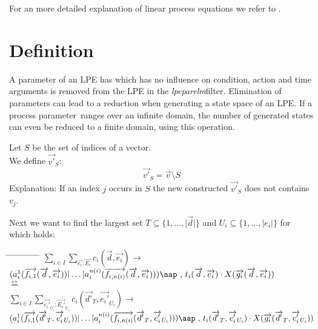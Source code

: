 \documentclass[a4paper,10pt]{article}
\theoremstyle{plain}
\theoremstyle{definition}
\newcommand{\lpe}{linear process equation}
\newcommand{\tool}{\textit{lpeparelm}}
\newcommand{\ovr}{\overrightarrow}
\newcommand{\pp}{process parameter}
\newcommand{\bisim}{\frac{\leftrightarrow}{}}
\newcommand{\tab}{\hspace*{5.mm} \= \hspace*{5.mm} \= \hspace*{5.mm} \= \hspace*{5.mm} \= \hspace*{5.mm} \= \hspace*{5.mm}  \= \hspace*{5.mm}  \= \hspace*{5.mm}  \= \hspace*{5.mm} \= \hspace*{5.mm} \= \hspace*{5.mm}  \= \hspace*{5.mm}  \= \hspace*{5.mm}\kill}
\newcommand{\at}[1]{\mbox{\aap ,} #1}
\begin{document}
For an more detailed explanation of \lpe s  we refer to \cite{LPE_info}.

\section{Definition}
A parameter of an LPE has which has no influence on condition, action and time arguments is removed from the LPE in the \tool filter. Elimination of parameters can lead to a reduction when generating a state space of an LPE. If a \pp\ ranges over an infinite domain, the number of generated states can even be reduced to a finite domain, using this operation. %


\begin{defn} Let $S$ be the set of indices of a vector.\\ 
We define $\ovr{v'}_S$:\\
$$\ovr{v'}_S = \ovr{v} \setminus S$$
Explanation: If an index $j$ occurs in $S$ the new constructed $\ovr{v'}_S$ does not contains $v_j$.
\end{defn}

Next we want to find the largest set $T \subseteq \lbrace 1, \ldots , \vert \ovr{d} \vert \rbrace$  and $U_i \subseteq \lbrace 1, \ldots, \vert {e_i} \vert \rbrace$ for which holds:

\begin{tabbing}
\tab
\> $\sum_{i \in I} \sum_{\ovr{e_i}:\ovr{E_i}} c_i ( \ovr{d}, \ovr{e_i} ) \rightarrow $\\
\> \> \> $(a_i^1 (\ovr{f_{i,1}}(\ovr{d},\ovr{e_i})) \vert \ldots \vert a_i^{n(i)}(\ovr{f_{i,n(i)}}(\ovr{d},\ovr{e_i}))) \at \text{ } t_i(\ovr{d},\ovr{e_i})  \cdot X(\ovr{g_i}(\ovr{d},\ovr{e_i})) 
$ \\
$\bisim$ \\
\> $\sum_{i \in I} \sum_{\ovr{e_i'}_{U_i}:\ovr{E_i'}_{U_i}} c_i( \ovr{d'}_T, \ovr{e_i'}_{U_i} ) \rightarrow $\\
\> \> \> 
$(a_i^1 (\ovr{f_{i,1}}(\ovr{d'}_T,\ovr{e_i'}_{U_i})) \vert \ldots \vert a_i^{n(i)}(\ovr{f_{i,n(i)}}(\ovr{d'}_T,\ovr{e_i'}_{U_i}))) \at \text{ } t_i(\ovr{d'}_T,\ovr{e_i'}_{U_i})  \cdot X(\ovr{g_i}(\ovr{d'}_T,\ovr{e_i'}_{U_i})) 
$ \\
\end{tabbing}
\end{document}
